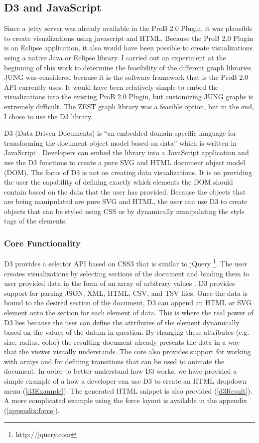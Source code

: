 \subsection{D3 and JavaScript}

Since a jetty server was already available in the ProB 2.0 Plugin, it was plausible to create visualizations using javascript and HTML. Because the ProB 2.0 Plugin is an Eclipse application, it also would have been possible to create visualizations using a native Java or Eclipse library. I carried out an experiment at the beginning of this work to determine the feasibility of the different graph libraries. JUNG was considered because it is the software framework that is the ProB 2.0 API currently uses. It would have been relatively simple to embed the visualizations into the existing ProB 2.0 Plugin, but customizing JUNG graphs is extremely difficult. The ZEST graph library was a feasible option, but in the end, I chose to use the D3 library. 

D3 (Data-Driven Documents) is ``an embedded domain-specific language for transforming
the document object model based on data'' which is written in JavaScript \cite{2011-d3}. Developers can embed the library into a JavaScript application and use the D3 functions to create a pure SVG and HTML document object model (DOM). The focus of D3 is not on creating data visualizations. It is on providing the user the capability of defining exactly which elements the DOM should contain based on the data that the user has provided. Because the objects that are being manipulated are pure SVG and HTML, the user can use D3 to create objects that can be styled using CSS or by dynamically manipulating the style tags of the elements.

\subsubsection{Core Functionality}

D3 provides a selector API based on CSS3 that is similar to jQuery \footnote{http://jquery.com}. The user creates visualizations by selecting sections of the document and binding them to user provided data in the form of an array of arbitrary values \cite{2011-d3}. D3 provides support for parsing JSON, XML, HTML, CSV, and TSV files. Once the data is bound to the desired section of the document, D3 can append an HTML or SVG element onto the section for each element of data. This is where the real power of D3 lies because the user can define the attributes of the element dynamically based on the values of the datum in question. By changing these attributes (e.g. size, radius, color) the resulting document already presents the data in a way that the viewer visually understands. The core also provides support for working with arrays and for defining transitions that can be used to animate the document. In order to better understand how D3 works, we have provided a simple example of a how a developer can use D3 to create an HTML dropdown menu (\ref{d3Example}). The generated HTML snippet is also provided (\ref{d3Result}). A more complicated example using the force layout is available in the appendix (\ref{appendix:force}).

